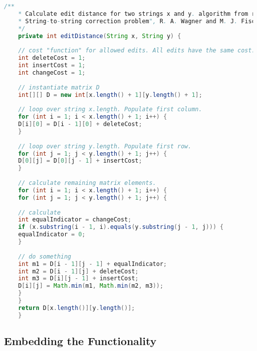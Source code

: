 \begin{lstlisting}[language=Java, caption=This is a code example., label=lst:2-gram]
	/**
	* Calculate edit distance for two strings x and y. algorithm from reference: "The
	* String-to-string correction problem", R. A. Wagner and M. J. Fischer
	*/
	private int editDistance(String x, String y) {
	
	// cost "function" for allowed edits. All edits have the same cost.
	int deleteCost = 1;
	int insertCost = 1;
	int changeCost = 1;
	
	// instantiate matrix D
	int[][] D = new int[x.length() + 1][y.length() + 1];
	
	// loop over string x.length. Populate first column.
	for (int i = 1; i < x.length() + 1; i++) {
	D[i][0] = D[i - 1][0] + deleteCost;
	}
	
	// loop over string y.length. Populate first row.
	for (int j = 1; j < y.length() + 1; j++) {
	D[0][j] = D[0][j - 1] + insertCost;
	}
	
	// calculate remaining matrix elements.
	for (int i = 1; i < x.length() + 1; i++) {
	for (int j = 1; j < y.length() + 1; j++) {
	
	// calculate
	int equalIndicator = changeCost;
	if (x.substring(i - 1, i).equals(y.substring(j - 1, j))) {
	equalIndicator = 0;
	}
	
	// do something
	int m1 = D[i - 1][j - 1] + equalIndicator;
	int m2 = D[i - 1][j] + deleteCost;
	int m3 = D[i][j - 1] + insertCost;
	D[i][j] = Math.min(m1, Math.min(m2, m3));
	}
	}
	return D[x.length()][y.length()];
	}
\end{lstlisting}






\subsection{Embedding the Functionality}


